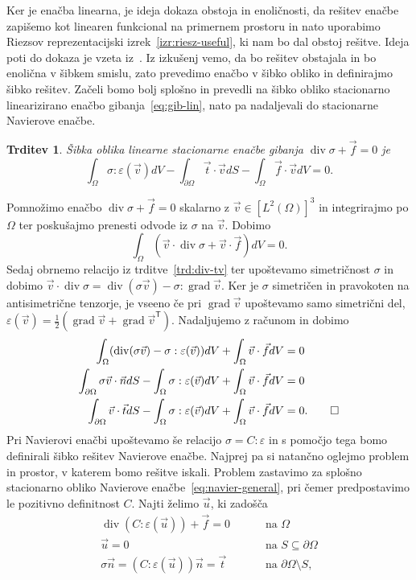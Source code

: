 \documentclass[a4paper,twoside]{article}
\theoremstyle{definition} %
\theoremstyle{plain} %
\newtheorem{trditev}[definicija]{Trditev}
\numberwithin{equation}{section}
\newcommand{\T}{\mathsf{T}}
\renewcommand{\div}{\operatorname{div}}
\newcommand{\grad}{\operatorname{grad}}
\newcommand{\eps}{\varepsilon}
\newcommand{\vv}{\vec{v}}
\newcommand{\vt}{\vec{t}}
\newcommand{\vu}{\vec{u}}
\newcommand{\vn}{\vec{n}}
\newcommand{\vf}{\vec{f}}
\newcommand{\ts}{\sigma}
\begin{document}
Ker je enačba linearna, je ideja dokaza obstoja in enoličnosti, da rešitev
enačbe zapišemo kot linearen funkcional na primernem prostoru in nato uporabimo
Riezsov reprezentacijski izrek~\ref{izr:riesz-useful}, ki nam bo dal obstoj
rešitve. Ideja poti do dokaza je vzeta iz~\cite[izrek 3.17.1, str.\
232]{lebedev2009introduction}. Iz izkušenj vemo, da bo rešitev obstajala in bo
enolična v šibkem smislu, zato prevedimo enačbo v šibko obliko in definirajmo
šibko rešitev. Začeli bomo bolj splošno in prevedli na šibko obliko
stacionarno linearizirano enačbo gibanja~\eqref{eq:gib-lin}, nato pa nadaljevali
do stacionarne Navierove enačbe.
\begin{trditev}
  Šibka oblika linearne stacionarne enačbe gibanja $\div \ts + \vf = 0$ je
  \begin{equation}
  \int_{\Omega}\ts : \eps(\vv) dV - \int_{\partial \Omega} \vt\cdot \vv dS -
    \int_{\Omega} \vf\cdot \vv dV = 0.
    \label{eq:cauchy-sibka}
  \end{equation}
\end{trditev}
\proof
Pomnožimo enačbo $\div\ts + \vf = 0$ skalarno z $\vv \in [L^2(\Omega)]^3$ in integrirajmo po
$\Omega$ ter poskušajmo prenesti odvode iz $\ts$ na $\vv$. Dobimo
\[
  \int_{\Omega}(\vv\cdot\div \ts + \vv\cdot\vf)dV = 0.
\]
Sedaj obrnemo relacijo iz trditve~\ref{trd:div-tv} ter upoštevamo simetričnost
$\ts$ in dobimo $\vv\cdot\div\ts = \div(\sigma \vv) - \sigma:\grad \vv$.
Ker je $\ts$ simetričen in pravokoten na antisimetrične tenzorje, je vseeno če
pri $\grad\vv$ upoštevamo samo simetrični del, $\eps(\vv) =
\frac12(\grad\vv+\grad\vv^\T)$. Nadaljujemo z računom in dobimo
\begin{align*}
\int_{\Omega}(\div(\sigma \vv) - \ts:\eps(\vv)) dV + \int_{\Omega} \vv\cdot\vf dV &= 0 \\
\int_{\partial \Omega}\sigma \vv \cdot \vn dS - \int_\Omega\ts:\eps(\vv) dV +
\int_{\Omega} \vv\cdot\vf dV &= 0 \\
\int_{\partial \Omega}\vv \cdot \vt dS - \int_\Omega\ts:\eps(\vv) dV +
\int_{\Omega} \vv\cdot\vf dV &= 0. \qedhere
\end{align*}
\endproof
Pri Navierovi enačbi upoštevamo še relacijo $\ts = C:\eps$ in s pomočjo tega
bomo definirali šibko rešitev Navierove enačbe. Najprej pa si natančno oglejmo
problem in prostor, v katerem bomo rešitve iskali.  Problem zastavimo za splošno
stacionarno obliko Navierove enačbe~\eqref{eq:navier-general}, pri čemer
predpostavimo le pozitivno definitnost $C$. Najti želimo $\vu$,
ki zadošča
\begin{align}
  \div(C:\eps(\vu)) + \vf = 0 &\qquad \text{ na } \Omega
  \label{eq:navier-general-problem} \\
  \vu = 0 &\qquad \text{ na } S \subseteq \partial\Omega \nonumber \\
  \ts\vn = (C:\eps(\vu))\vn = \vt &\qquad \text{ na } \partial\Omega \setminus
  S, \nonumber
\end{align}
\end{document}
